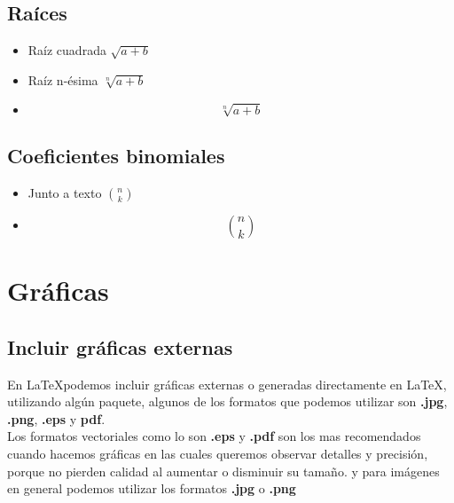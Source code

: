 \documentclass[12pt]{article}
\begin{document}
\subsection{Raíces}
\begin{itemize}
\item Raíz cuadrada $ \sqrt{a+b}$
\item Raíz n-ésima $ \sqrt[n]{a+b}$
\item \[\sqrt[n]{a+b}\]
\end{itemize}

\subsection{Coeficientes binomiales}
\begin{itemize}
\item Junto a texto $ \binom{n}{k}$
\item \[\binom{n}{k}\]
\end{itemize}

\section{Gráficas}

\subsection{Incluir gráficas externas}
En \LaTeX podemos incluir gráficas externas o generadas
directamente en \LaTeX , utilizando algún paquete, algunos de los formatos que podemos utilizar son \textbf{.jpg}, \textbf{.png}, \textbf{.eps} y \textbf{pdf}.\\[0.5cm]
Los formatos vectoriales como lo son \textbf{.eps} y \textbf{.pdf} son los mas recomendados cuando hacemos gráficas en las cuales queremos observar detalles y precisión, porque no pierden calidad al aumentar o disminuir su tamaño. y para imágenes en general podemos utilizar los formatos \textbf{.jpg} o \textbf{.png}
\end{document}
